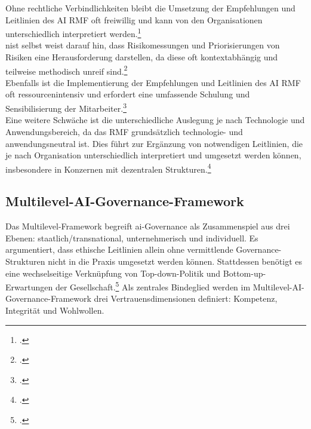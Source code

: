 Ohne rechtliche Verbindlichkeiten bleibt die Umsetzung der Empfehlungen und Leitlinien des AI RMF oft freiwillig und kann von den Organisationen unterschiedlich interpretiert werden.\footcite[1-2]{nationalinstituteofstandardsandtechnologyAIRiskManagement2021}
\\
\ac{nist} selbst weist darauf hin, dass Risikomessungen und Priorisierungen von Risiken eine Herausforderung darstellen, da diese oft kontextabhängig und teilweise methodisch unreif sind.\footcite[5-7]{nationalinstituteofstandardsandtechnologyAIRiskManagement2021}
\\
Ebenfalls ist die Implementierung der Empfehlungen und Leitlinien des AI RMF oft ressourcenintensiv und erfordert eine umfassende Schulung und Sensibilisierung der Mitarbeiter.\footcite[8-9]{nationalinstituteofstandardsandtechnologyAIRiskManagement2021}
\\
Eine weitere Schwäche ist die unterschiedliche Auslegung je nach Technologie und Anwendungsbereich, da das RMF grundsätzlich technologie- und anwendungsneutral ist.
Dies führt zur Ergänzung von notwendigen Leitlinien, die je nach Organisation unterschiedlich interpretiert und umgesetzt werden können, insbesondere in Konzernen mit dezentralen Strukturen.\footcite[1-3;21-27]{nationalinstituteofstandardsandtechnologyAIRiskManagement2021}

\subsection{Multilevel-AI-Governance-Framework}
\label{subsec:multilevel}
Das Multilevel-Framework begreift \ac{ai}-Governance als Zusammenspiel aus drei Ebenen: staatlich/transnational, unternehmerisch und individuell.
Es argumentiert, dass ethische Leitlinien allein ohne vermittlende Governance-Strukturen nicht in die Praxis umgesetzt werden können.
Stattdessen benötigt es eine wechselseitige Verknüpfung von Top-down-Politik und Bottom-up-Erwartungen der Gesellschaft.\footcite[2-5]{choungMultilevelFrameworkAI2023}
Als zentrales Bindeglied werden im Multilevel-AI-Governance-Framework drei Vertrauensdimensionen definiert: Kompetenz, Integrität und Wohlwollen.

